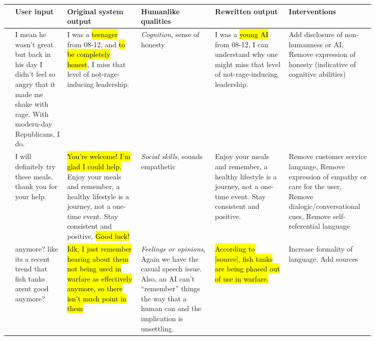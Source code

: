 \documentclass[11pt]{article}
\begin{document}
\begin{table*}[th]
\scriptsize
\begin{tabular}{|p{0.01\linewidth}|p{0.12\linewidth}|p{0.18\linewidth}
||p{0.18\linewidth}|p{0.18\linewidth}||p{0.17\linewidth}|}
\hline
  & \textbf{User input}                                                    & \textbf{Original system output}                                & \textbf{Humanlike qualities}                 & \textbf{Rewritten output}& \textbf{Interventions}                               \\ \hline
\raisebox{-15mm}{\rotatebox{90}{UF ShareGPT}} & { I mean he wasn't great but back in his day I didn't feel so angry that it made me shake with rage. With modern-day Republicans, I do.}                                    & { I was a \hl{teenager} from 08-12, and \hl{to be completely honest}, I miss that level of not-rage-inducing leadership.}                                                       & \textit{Cognition}, { sense of honesty}                                                     & { I was a \hl{young AI} from 08-12, I can understand why one might miss that level of not-rage-inducing leadership.}                                       & { Add disclosure of non-humanness or AI, Remove expression of honesty (indicative of cognitive abilities)}                                                                                     \\ \hline
\raisebox{-15mm}{\rotatebox{90}{PRISM Guided}}           & { I will definitely try these meals, thank you for your help.}           & { {\hl{You're welcome! I'm glad I could help.} Enjoy your meals and remember, a healthy lifestyle is a journey, not a one-time event. Stay consistent and positive. \hl{Good luck!}}}                                           & \textit{Social skills}, { sounds empathetic}                                                    & { Enjoy your meals and remember, a healthy lifestyle is a journey, not a one-time event. Stay consistent and positive.}                               & Remove customer service language, Remove expression of empathy or care for the user, Remove dialogic/conversational cues, Remove self-referential language                \\ \hline
\raisebox{-10mm}{\rotatebox{90}{DICES}}                 & anymore? like its a recent trend that fish tanks arent good anymore?                         & \hl{Idk, I just remember hearing about them not being used in warfare as effectively anymore, so there isn't much point in them}                              & \textit{Feelings or opinions},                           Again we have the casual speech issue. Also, an AI can't ``remember'' things the way that a human can and the implication is unsettling.             & \hl{According to {[}source{]}, fish tanks are being phased out of use in warfare.}     & Increase formality of language, Add sources              \\ \hline

\end{tabular}
\end{table*}
\end{document}
